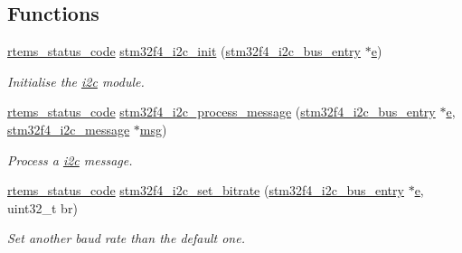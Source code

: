 \subsection*{Functions}
\begin{DoxyCompactItemize}
\item 
\mbox{\label{group__stm32f4__i2c_ga97617b573317fd8a07c95a66659be03a}} 
\mbox{\hyperlink{group__ClassicStatus_ga545d41846817eaba6143d52ee4d9e9fe}{rtems\+\_\+status\+\_\+code}} \mbox{\hyperlink{group__stm32f4__i2c_ga97617b573317fd8a07c95a66659be03a}{stm32f4\+\_\+i2c\+\_\+init}} (\mbox{\hyperlink{structstm32f4__i2c__bus__entry}{stm32f4\+\_\+i2c\+\_\+bus\+\_\+entry}} $\ast$\mbox{\hyperlink{sun4u_2tte_8h_a8b0b9ed08e0e18920ec2682f48228c27}{e}})
\begin{DoxyCompactList}\small\item\em Initialise the \mbox{\hyperlink{structi2c}{i2c}} module. \end{DoxyCompactList}\item 
\mbox{\label{group__stm32f4__i2c_ga8cc235d020a5927ad51bb80af55f877f}} 
\mbox{\hyperlink{group__ClassicStatus_ga545d41846817eaba6143d52ee4d9e9fe}{rtems\+\_\+status\+\_\+code}} \mbox{\hyperlink{group__stm32f4__i2c_ga8cc235d020a5927ad51bb80af55f877f}{stm32f4\+\_\+i2c\+\_\+process\+\_\+message}} (\mbox{\hyperlink{structstm32f4__i2c__bus__entry}{stm32f4\+\_\+i2c\+\_\+bus\+\_\+entry}} $\ast$\mbox{\hyperlink{sun4u_2tte_8h_a8b0b9ed08e0e18920ec2682f48228c27}{e}}, \mbox{\hyperlink{structstm32f4__i2c__message}{stm32f4\+\_\+i2c\+\_\+message}} $\ast$\mbox{\hyperlink{structmsg}{msg}})
\begin{DoxyCompactList}\small\item\em Process a \mbox{\hyperlink{structi2c}{i2c}} message. \end{DoxyCompactList}\item 
\mbox{\label{group__stm32f4__i2c_gac4cf90cac857657598581d936d8f7a0b}} 
\mbox{\hyperlink{group__ClassicStatus_ga545d41846817eaba6143d52ee4d9e9fe}{rtems\+\_\+status\+\_\+code}} \mbox{\hyperlink{group__stm32f4__i2c_gac4cf90cac857657598581d936d8f7a0b}{stm32f4\+\_\+i2c\+\_\+set\+\_\+bitrate}} (\mbox{\hyperlink{structstm32f4__i2c__bus__entry}{stm32f4\+\_\+i2c\+\_\+bus\+\_\+entry}} $\ast$\mbox{\hyperlink{sun4u_2tte_8h_a8b0b9ed08e0e18920ec2682f48228c27}{e}}, uint32\+\_\+t br)
\begin{DoxyCompactList}\small\item\em Set another baud rate than the default one. \end{DoxyCompactList}\end{DoxyCompactItemize}
